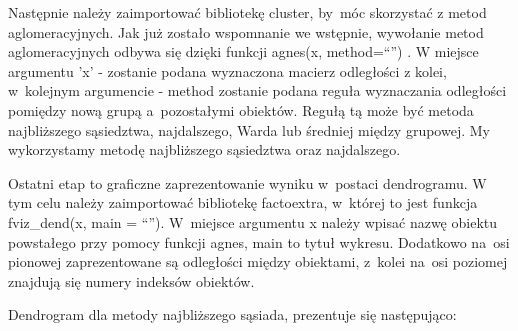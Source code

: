 \documentclass[12pt,a4paper]{report}
\begin{document}
{\begin{Shaded}
\begin{Highlighting}[]
\StringTok{ }\NormalTok{(dane_porzadkowanie[,}\NormalTok{(}\NormalTok{,}\NormalTok{,}
            \NormalTok{,}\NormalTok{,}\NormalTok{)],                                           } \NormalTok{)}
\end{Highlighting}
\end{Shaded}

Następnie należy zaimportować bibliotekę cluster, by~móc skorzystać z
metod aglomeracyjnych. Jak już zostało wspomnanie we wstępnie, wywołanie
metod aglomeracyjnych odbywa się dzięki funkcji agnes(x, method=``'') .
W miejsce argumentu 'x' - zostanie podana wyznaczona macierz odległości z
kolei, w~kolejnym argumencie - method zostanie podana reguła wyznaczania
odległości pomiędzy nową grupą a~pozostałymi obiektów. Regułą tą może
być metoda najbliższego sąsiedztwa, najdalszego, Warda lub średniej
między grupowej. My wykorzystamy metodę najbliższego sąsiedztwa oraz
najdalszego.

\begin{Shaded}
\begin{Highlighting}[]
\StringTok{ } \NormalTok{)}
\StringTok{ } \NormalTok{)}
\end{Highlighting}
\end{Shaded}

Ostatni etap to graficzne zaprezentowanie wyniku w~postaci dendrogramu.
W tym celu należy zaimportować bibliotekę factoextra, w~której to jest
funkcja fviz\_dend(x, main = ``''). W~miejsce argumentu x należy wpisać
nazwę obiektu powstałego przy pomocy funkcji agnes, main to tytuł
wykresu. Dodatkowo na~osi pionowej zaprezentowane są odległości między
obiektami, z~kolei na~osi poziomej znajdują się numery indeksów
obiektów.

Dendrogram dla metody najbliższego sąsiada, prezentuje się następująco:

\begin{Shaded}
\begin{Highlighting}[]
\NormalTok{, }\NormalTok{, }
 \NormalTok{)}
\end{Highlighting}
\end{Shaded}

}
\end{document}
